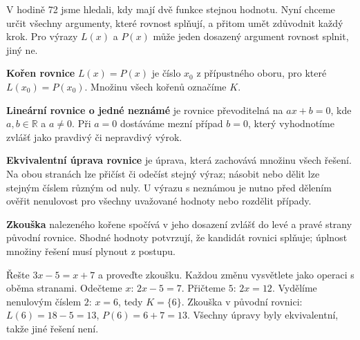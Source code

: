 \documentclass[11pt,a4paper]{article}
\begin{document}
V hodině 72 jsme hledali, kdy mají dvě funkce stejnou hodnotu. Nyní chceme určit všechny argumenty, které rovnost splňují, a přitom umět zdůvodnit každý krok. Pro výrazy $L(x)$ a $P(x)$ může jeden dosazený argument rovnost splnit, jiný ne.
\begin{definiceBox}
\textbf{Kořen rovnice} $L(x)=P(x)$ je číslo $x_0$ z přípustného oboru, pro které $L(x_0)=P(x_0)$. Množinu všech kořenů označíme $K$.
\end{definiceBox}
\begin{definiceBox}
\textbf{Lineární rovnice o jedné neznámé} je rovnice převoditelná na $ax+b=0$, kde $a,b\in\mathbb R$ a $a\ne0$. Při $a=0$ dostáváme mezní případ $b=0$, který vyhodnotíme zvlášť jako pravdivý či nepravdivý výrok.
\end{definiceBox}
\begin{definiceBox}
\textbf{Ekvivalentní úprava rovnice} je úprava, která zachovává množinu všech řešení. Na obou stranách lze přičíst či odečíst stejný výraz; násobit nebo dělit lze stejným číslem různým od nuly. U výrazu s neznámou je nutno před dělením ověřit nenulovost pro všechny uvažované hodnoty nebo rozdělit případy.
\end{definiceBox}
\begin{definiceBox}
\textbf{Zkouška} nalezeného kořene spočívá v jeho dosazení zvlášť do levé a pravé strany původní rovnice. Shodné hodnoty potvrzují, že kandidát rovnici splňuje; úplnost množiny řešení musí plynout z postupu.
\end{definiceBox}
\begin{prikladReseniBox}
Řešte $3x-5=x+7$ a proveďte zkoušku. Každou změnu vysvětlete jako operaci s oběma stranami.
\tcblower
Odečteme $x$: $2x-5=7$. Přičteme $5$: $2x=12$. Vydělíme nenulovým číslem $2$: $x=6$, tedy $K=\{6\}$. Zkouška v původní rovnici: $L(6)=18-5=13$, $P(6)=6+7=13$. Všechny úpravy byly ekvivalentní, takže jiné řešení není.
\end{prikladReseniBox}
\begin{center}
\end{center}
\end{document}
